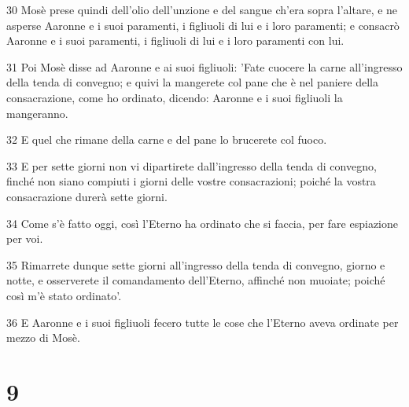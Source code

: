 \par 30 Mosè prese quindi dell'olio dell'unzione e del sangue ch'era sopra l'altare, e ne asperse Aaronne e i suoi paramenti, i figliuoli di lui e i loro paramenti; e consacrò Aaronne e i suoi paramenti, i figliuoli di lui e i loro paramenti con lui.
\par 31 Poi Mosè disse ad Aaronne e ai suoi figliuoli: 'Fate cuocere la carne all'ingresso della tenda di convegno; e quivi la mangerete col pane che è nel paniere della consacrazione, come ho ordinato, dicendo: Aaronne e i suoi figliuoli la mangeranno.
\par 32 E quel che rimane della carne e del pane lo brucerete col fuoco.
\par 33 E per sette giorni non vi dipartirete dall'ingresso della tenda di convegno, finché non siano compiuti i giorni delle vostre consacrazioni; poiché la vostra consacrazione durerà sette giorni.
\par 34 Come s'è fatto oggi, così l'Eterno ha ordinato che si faccia, per fare espiazione per voi.
\par 35 Rimarrete dunque sette giorni all'ingresso della tenda di convegno, giorno e notte, e osserverete il comandamento dell'Eterno, affinché non muoiate; poiché così m'è stato ordinato'.
\par 36 E Aaronne e i suoi figliuoli fecero tutte le cose che l'Eterno aveva ordinate per mezzo di Mosè.

\chapter{9}

